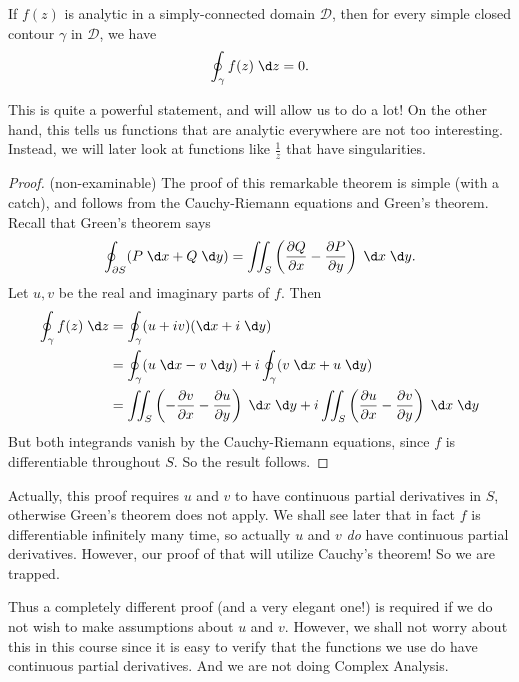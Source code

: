 \documentclass[a4paper]{article}
\begin{document}
\begin{thm}
  If $f(z)$ is analytic in a simply-connected domain $\mathcal{D}$, then for every simple closed contour $\gamma$ in $\mathcal{D}$, we have
  \[
    \oint_\gamma f(z)\;\d z = 0.
  \]
\end{thm}
This is quite a powerful statement, and will allow us to do a lot! On the other hand, this tells us functions that are analytic everywhere are not too interesting. Instead, we will later look at functions like $\frac{1}{z}$ that have singularities.

\begin{proof}(non-examinable)
  The proof of this remarkable theorem is simple (with a catch), and follows from the Cauchy-Riemann equations and Green's theorem. Recall that Green's theorem says
  \[
    \oint_{\partial S} (P \;\d x + Q\;\d y) = \iint_S \left(\frac{\partial Q}{\partial x} - \frac{\partial P}{\partial y}\right)\;\d x\;\d y.
  \]
  Let $u, v$ be the real and imaginary parts of $f$. Then
  \begin{align*}
    \oint_\gamma f(z) \;\d z &= \oint_\gamma (u + iv) (\d x + i\;\d y)\\
    &= \oint_\gamma (u\;\d x - v\;\d y) + i \oint_\gamma (v \;\d x + u \;\d y)\\
    &= \iint_S \left(-\frac{\partial v}{\partial x} - \frac{\partial u}{\partial y}\right)\;\d x\;\d y + i\iint_S \left(\frac{\partial u}{\partial x} - \frac{\partial v}{\partial y}\right)\;\d x \;\d y
  \end{align*}
  But both integrands vanish by the Cauchy-Riemann equations, since $f$ is differentiable throughout $S$. So the result follows.
\end{proof}
Actually, this proof requires $u$ and $v$ to have continuous partial derivatives in $S$, otherwise Green's theorem does not apply. We shall see later that in fact $f$ is differentiable infinitely many time, so actually $u$ and $v$ \emph{do} have continuous partial derivatives. However, our proof of that will utilize Cauchy's theorem! So we are trapped.

Thus a completely different proof (and a very elegant one!) is required if we do not wish to make assumptions about $u$ and $v$. However, we shall not worry about this in this course since it is easy to verify that the functions we use do have continuous partial derivatives. And we are not doing Complex Analysis.
\end{document}
